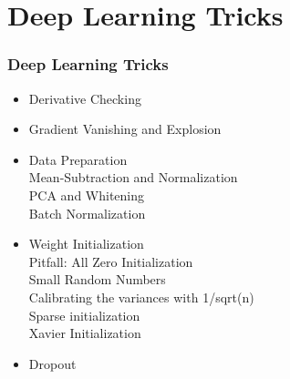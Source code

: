 
\ifx\allfiles\undefined

\fi
\section{Deep Learning Tricks}
\begin{frame}
\frametitle{Deep Learning Tricks}
	\small
	\begin{itemize}
		\item Derivative Checking
		\item Gradient Vanishing and Explosion
		\item Data Preparation
			\\\hspace{1cm} Mean-Subtraction and Normalization
			\\\hspace{1cm} PCA and Whitening 
			\\\hspace{1cm} Batch Normalization
		\item Weight Initialization
			\\\hspace{1cm}Pitfall: All Zero Initialization
			\\\hspace{1cm}Small Random Numbers
			\\\hspace{1cm}Calibrating the variances with 1/sqrt(n)
			\\\hspace{1cm}Sparse initialization
			\\\hspace{1cm}Xavier Initialization
		\item Dropout
	\end{itemize}
\end{frame}
